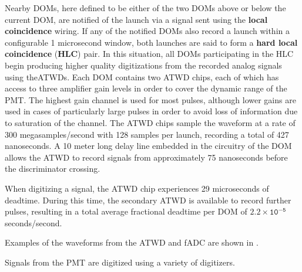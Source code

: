 Nearby DOMs, here defined to be either of the two DOMs above or below the current DOM, are notified of the launch via a signal sent using the \textbf{local coincidence} wiring.
If any of the notified DOMs also record a launch within a configurable 1 microsecond window, both launches are said to form a \textbf{hard local coincidence} (\textbf{HLC}) pair.
In this situation, all DOMs participating in the HLC begin producing higher quality digitizations from the recorded analog signals using theATWDs.
Each DOM contains two ATWD chips, each of which has access to three amplifier gain levels in order to cover the dynamic range of the PMT.
The highest gain channel is used for most pulses, although lower gains are used in cases of particularly large pulses in order to avoid loss of information due to saturation of the channel.
The ATWD chips sample the waveform at a rate of 300 megasamples/second with 128 samples per launch, recording a total of 427 nanoseconds.
A 10 meter long delay line embedded in the circuitry of the DOM allows the ATWD to record signals from approximately 75 nanoseconds before the discriminator crossing.

When digitizing a signal, the ATWD chip experiences 29 microseconds of deadtime. 
During this time, the secondary ATWD is available to record further pulses, resulting in a total average fractional deadtime per DOM of $\mathtt{2.2 \times 10^{-5}}$ seconds/second.

Examples of the waveforms from the ATWD and fADC are shown in .



Signals from the PMT are digitized using a variety of digitizers.




